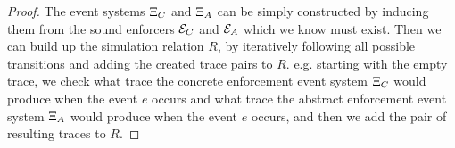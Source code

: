 \begin{proof}
    The event systems $\Xi_C$ and $\Xi_A$
    can be simply constructed by inducing them from the
    sound enforcers $\mathcal{E}_C$ and $\mathcal{E}_A$
    which we know must exist.
    Then we can build up the simulation relation $R$, by
    iteratively following all possible transitions and adding
    the created trace pairs to $R$.
    e.g. starting with the empty trace, we check what trace
    the concrete enforcement event system
    $\Xi_C$ would produce when the event
    $e$ occurs and what trace the abstract enforcement
    event system $\Xi_A$ would produce when
    the event $e$ occurs, and then we add the pair of resulting
    traces to $R$.
\end{proof}


